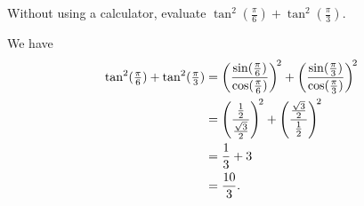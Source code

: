 \question[3]
Without using a calculator, evaluate $\tan^2(\frac{\pi}{6}) + \tan^2(\frac{\pi}{3})$.

\begin{EnvFullwidth}
\begin{solutionorgrid}[2.5in]
We have
\begin{align*}
	\tan^2(\tfrac{\pi}{6}) + \tan^2(\tfrac{\pi}{3}) &= \left(\frac{\sin(\frac{\pi}{6})}{\cos(\frac{\pi}{6})}\right)^{\! 2} + \left(\frac{\sin(\frac{\pi}{3})}{\cos(\frac{\pi}{3})}\right)^{\! 2} \\
	&= \left(\frac{\frac{1}{2}}{\frac{\sqrt{3}}{2}}\right)^{\! 2} + \left(\frac{\frac{\sqrt{3}}{2}}{\frac{1}{2}}\right)^{\! 2} \\
	&= \frac{1}{3} + 3 \\
	&= \frac{10}{3}.
\end{align*}
\end{solutionorgrid}
\end{EnvFullwidth}

